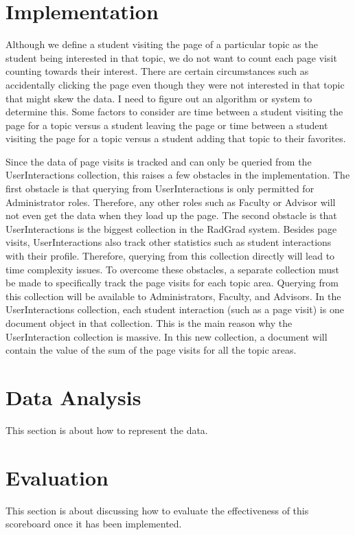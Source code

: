 \documentclass[english]{proposalnsf}
\begin{document}
  \section{Implementation}
  \label{sec:implementation}
  Although we define a student visiting the page of a particular topic as the student being interested in that topic,
  we do not want to count each page visit counting towards their interest. There are certain circumstances such as
  accidentally clicking the page even though they were not interested in that topic that might skew the data. I need to
  figure out an algorithm or system to determine this. Some factors to consider are time between a student visiting the
  page for a topic versus a student leaving the page or time between a student visiting the page for a topic versus a
  student adding that topic to their favorites.

  Since the data of page visits is tracked and can only be queried from the UserInteractions collection, this raises a
  few obstacles in the implementation. The first obstacle is that querying from UserInteractions is only permitted for
  Administrator roles. Therefore, any other roles such as Faculty or Advisor will not even get the data when they load
  up the page. The second obstacle is that UserInteractions is the biggest collection in the RadGrad system. Besides
  page visits, UserInteractions also track other statistics such as student interactions with their profile. Therefore,
  querying from this collection directly will lead to time complexity issues. To overcome these obstacles, a separate
  collection must be made to specifically track the page visits for each topic area. Querying from this collection will
  be available to Administrators, Faculty, and Advisors. In the UserInteractions collection, each student interaction
  (such as a page visit) is one document object in that collection. This is the main reason why the UserInteraction
  collection is massive. In this new collection, a document will contain the value of the sum of the page visits for
  all the topic areas.

  \section{Data Analysis}
  \label{sec:data-analysis}
  This section is about how to represent the data.

  \section{Evaluation}
  \label{sec:evaluation}
  This section is about discussing how to evaluate the effectiveness of this scoreboard once it has been implemented.

  \appendix
\end{document}
